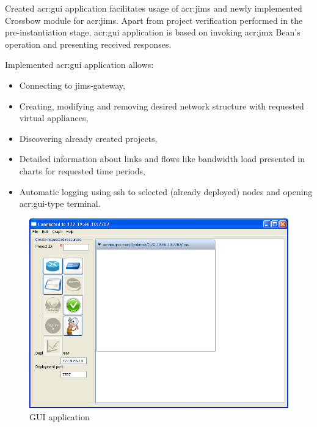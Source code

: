 \documentclass[11pt]{book}
\begin{document}
        Created \gls{acr:gui} application facilitates usage of \gls{acr:jims} and newly implemented Crossbow module for
        \gls{acr:jims}. Apart from project verification performed in the pre-instantiation stage, \gls{acr:gui}
        application is based on invoking \gls{acr:jmx} Bean's operation and presenting received responses.

        Implemented \gls{acr:gui} application allows:

        \begin{itemize}
          \item Connecting to jims-gateway,
          \item Creating, modifying and removing desired network structure with requested virtual appliances,
          \item Discovering already created projects,
          \item Detailed information about links and flows like bandwidth load presented in charts for requested time
                periods,
          \item Automatic logging using ssh to selected (already deployed) nodes and opening \gls{acr:gui}-type
                terminal.
        \end{itemize}		

        \begin{figure}[H]
          \centering
          \includegraphics[width=1.0\textwidth]{img/impl/gui.png}

          \caption{GUI application}
        \end{figure}
\end{document}
